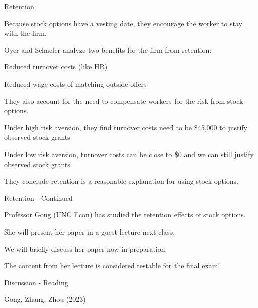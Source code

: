 \documentclass[aspectratio=169,usenames,dvipsnames]{beamer}
\newenvironment{wideitemize}{\itemize\addtolength{\itemsep}{10pt}}{\enditemize}
\begin{document}
\begin{frame}{Retention}

\begin{wideitemize}
    \item Because stock options have a vesting date, they encourage the worker to stay with the firm.
    \item Oyer and Schaefer analyze two benefits for the firm from retention:
    \begin{wideitemize}
            \item Reduced turnover costs (like HR)
            \item Reduced wage costs of matching outside offers
    \end{wideitemize}
    \item They also account for the need to compensate workers for the risk from stock options.
    \item Under high risk aversion, they find turnover costs need to be \$45,000 to justify observed stock grants
    \item Under low risk aversion, turnover costs can be close to \$0 and we can still justify observed stock grants.
    \item They conclude retention is a reasonable explanation for using stock options.
\end{wideitemize}
    
\end{frame}

\begin{frame}{Retention - Continued}
\begin{wideitemize}
    \item Professor Gong (UNC Econ) has studied the retention effects of stock options.
    \item She will present her paper in a guest lecture next class.
    \item We will briefly discuss her paper now in preparation.
    \item The content from her lecture is considered testable for the final exam!
\end{wideitemize}
    
\end{frame}

\begin{frame}{Discussion - Reading}

\huge  Gong, Zhang, Zhou (2023)
    
\end{frame}
\end{document}
